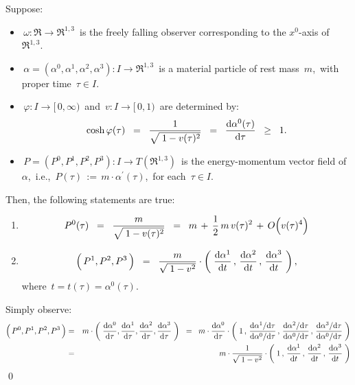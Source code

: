 
\vskip 0.5cm
\begin{proposition}
\mbox{}
\vskip -0.01cm
\noindent
Suppose:
\begin{itemize}
\item
	\,$\omega : \Re \longrightarrow \Re^{1,3}$\, is the freely falling observer
	corresponding to the $x^{0}$-axis of \,$\Re^{1,3}$.\,
\item
	\,$\alpha = (\alpha^{0},\alpha^{1},\alpha^{2},\alpha^{3}) : I \longrightarrow \Re^{1,3}$\,
	is a material particle of rest mass \,$m$,\,
	with proper time \,$\tau \in I$.
\item
	\,$\varphi : I \longrightarrow [\,0,\infty)$\, and \,$v : I \longrightarrow [\,0,1)$\,
	are determined by:
	\begin{equation*}
	\cosh\varphi(\tau)
	\;\; = \;\;
		\dfrac{1}{\sqrt{\;1 - v(\tau)^{2}}}
	\;\; = \;\;
		\dfrac{\textnormal{d}\alpha^{0}(\tau)}{\textnormal{d}\tau}
	\;\; \geq \;\;
		1.
	\end{equation*}
\item
	\,$P = (P^{0},P^{1},P^{2},P^{3}) : I \longrightarrow T(\Re^{1,3})$\,
	is the energy-momentum vector field of \,$\alpha$,\,
	i.e.,
	\,$P(\tau) \,:=\, m\cdot\alpha^{\prime}(\tau)$,\,
	for each \,$\tau \in I$.
\end{itemize}
Then, the following statements are true:
\begin{enumerate}
\item
	\begin{equation*}
	P^{0}(\tau)
	\;\; = \;\;
		\dfrac{m}{\sqrt{\;1-v(\tau)^{2}}}
	\;\; = \;\;
		m \,+\, \dfrac{1}{2}\,m\,v(\tau)^{2} \,+\, O\!\left(\overset{{\color{white}.}}{v(\tau)^{4}}\right)
	\end{equation*}
\item
	\begin{equation*}
	\left(\,\overset{{\color{white}.}}{P^{1}},P^{2},P^{3}\,\right)
	\;\; = \;\;
		\dfrac{m}{\sqrt{\;1-v^{2}}}
		\cdot
		\left(\;
			\dfrac{\d\alpha^{1}}{\d t}\,,\,
			\dfrac{\d\alpha^{2}}{\d t}\,,\,
			\dfrac{\d\alpha^{3}}{\d t}
			\;\right),
	\end{equation*}
	where \,$t = t(\tau) = \alpha^{0}(\tau)$.
\end{enumerate}
\end{proposition}
\proof
Simply observe:
\begin{eqnarray*}
\left(\,\overset{{\color{white}.}}{P^{0}},P^{1},P^{2},P^{3}\,\right)
& = &
	m\cdot\left(\;
		\dfrac{\d\alpha^{0}}{\d\tau},
		\dfrac{\d\alpha^{1}}{\d\tau},
		\dfrac{\d\alpha^{2}}{\d\tau},
		\dfrac{\d\alpha^{3}}{\d\tau}
		\;\right)
\;\; = \;\;
	m\cdot\dfrac{\d\alpha^{0}}{\d\tau}\cdot
	\left(\;
		1\,,\,
		\dfrac{\d\alpha^{1}/\d\tau}{\d\alpha^{0}/\d\tau}\,,\,
		\dfrac{\d\alpha^{2}/\d\tau}{\d\alpha^{0}/\d\tau}\,,\,
		\dfrac{\d\alpha^{3}/\d\tau}{\d\alpha^{0}/\d\tau}
		\;\right)
\\
& = &
	m\cdot
	\dfrac{1}{\sqrt{\;1-v^{2}}}
	\cdot
	\left(\;
		1\,,\,
		\dfrac{\d\alpha^{1}}{\d t}\,,\,
		\dfrac{\d\alpha^{2}}{\d t}\,,\,
		\dfrac{\d\alpha^{3}}{\d t}
		\;\right)
\end{eqnarray*}
\qed


